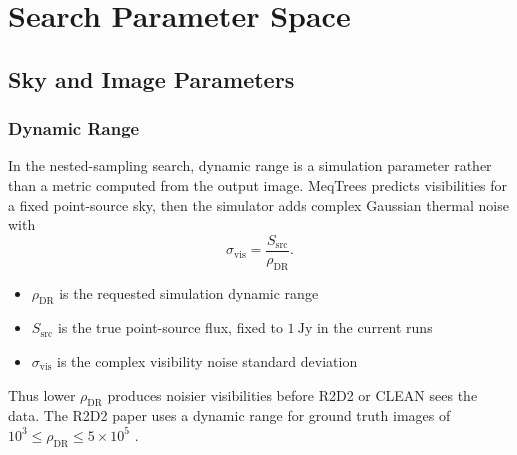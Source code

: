 \documentclass[11pt]{article}
\begin{document}


\section{Search Parameter Space}

\subsection{Sky and Image Parameters}

\subsubsection{Dynamic Range}
\label{sec:param-dynamic-range}

In the nested-sampling search, dynamic range is a simulation parameter rather than a metric computed from the output image.
MeqTrees predicts visibilities for a fixed point-source sky, then the simulator adds complex Gaussian thermal noise with
\begin{equation}
    \sigma_{\text{vis}}
    =
    \frac{S_{\text{src}}}{\rho_{\text{DR}}}.
\end{equation}

\begin{itemize}
    \item $\rho_{\text{DR}}$ is the requested simulation dynamic range
    \item $S_{\text{src}}$ is the true point-source flux, fixed to $1~\mathrm{Jy}$ in the current runs
    \item $\sigma_{\text{vis}}$ is the complex visibility noise standard deviation
\end{itemize}

Thus lower $\rho_{\text{DR}}$ produces noisier visibilities before R2D2 or CLEAN sees the data.
The R2D2 paper uses a dynamic range for ground truth images of $10^3\le \rho_\text{DR}\le5\times10^5$ \cite{aghabiglou2025r2d2}.

\end{document}
